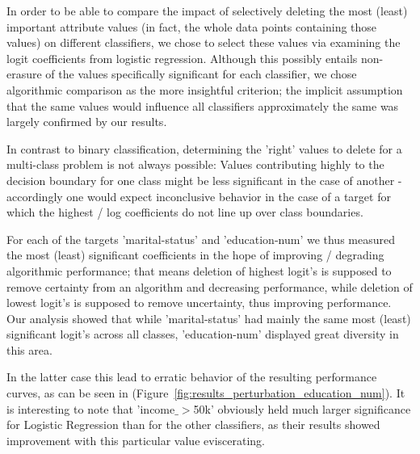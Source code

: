 \documentclass{llncs}
\begin{document}
In order to be able to compare the impact of selectively deleting the most (least) important attribute values (in fact, the whole data points containing those values) on different classifiers, we chose to select these values via examining the logit coefficients from logistic regression. Although this possibly entails non-erasure of the values specifically significant for each classifier, we chose algorithmic comparison as the more insightful criterion; the implicit assumption that the same values would influence all classifiers approximately the same was largely confirmed by our results.

In contrast to binary classification, determining the 'right' values to delete for a multi-class problem is not always possible: Values contributing highly to the decision boundary for one class might be less significant in the case of another - accordingly one would expect inconclusive behavior in the case of a target for which the highest / log coefficients do not line up over class boundaries.

For each of the targets 'marital-status' and 'education-num' we thus measured the most (least) significant coefficients in the hope of improving / degrading algorithmic performance; that means deletion of highest logit's is supposed to remove certainty from an algorithm and decreasing performance, while deletion of lowest logit's is supposed to remove uncertainty, thus improving performance. Our analysis showed that while 'marital-status' had mainly the same most (least) significant logit's across all classes, 'education-num' displayed great diversity in this area.


In the latter case this lead to erratic behavior of the resulting performance curves, as can be seen in (Figure~\ref{fig:results_perturbation_education_num}). It is interesting to note that 'income$\_>$50k' obviously held much larger significance for Logistic Regression than for the other classifiers, as their results showed improvement with this particular value eviscerating.
\end{document}
